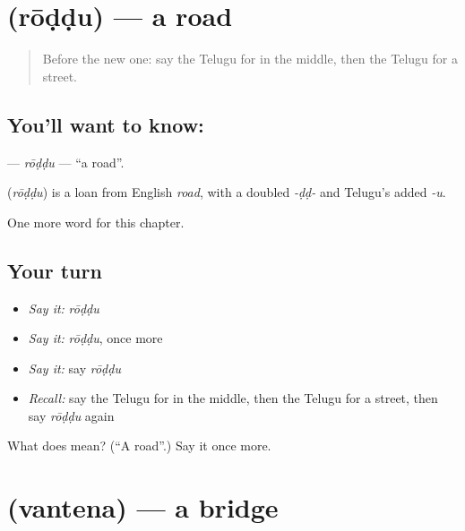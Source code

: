 \section[\texorpdfstring{\te{రోడ్డు} (rōḍḍu)}{రోడ్డు (rōḍḍu)}]{ (rōḍḍu) — a road}

\label{lesson:TE-C102-roddu}



\begin{quote}
Before the new one: say the Telugu for in the middle, then the Telugu for a street.
\end{quote}

\subsection*{You'll want to know: }
\textbf{} — \emph{rōḍḍu} — \textquotedblleft{}a road\textquotedblright{}.

\begin{cousinweb}
\textbf{} (\emph{rōḍḍu}) is a loan from English \emph{road}, with a doubled \emph{-ḍḍ-} and Telugu's added \emph{-u}.
\end{cousinweb}

\begin{grammarlens}[title={What you've built}]
One more word for this chapter.
\end{grammarlens}

\subsection*{Your turn}
\begin{itemize}
\raggedright
  \item \emph{Say it:} \emph{rōḍḍu}
  \item \emph{Say it:} \emph{rōḍḍu}, once more
  \item \emph{Say it:} say \emph{rōḍḍu}
  \item \emph{Recall:} say the Telugu for in the middle, then the Telugu for a street, then say \emph{rōḍḍu} again
\end{itemize}

\begin{tcolorbox}[breakable,colback=teal!4,colframe=teal!35!black,title={Before you move on}]
What does  mean? (\textquotedblleft{}A road\textquotedblright{}.) Say it once more.
\end{tcolorbox}
\section[\texorpdfstring{\te{వంతెన} (vantena)}{వంతెన (vantena)}]{ (vantena) — a bridge}

